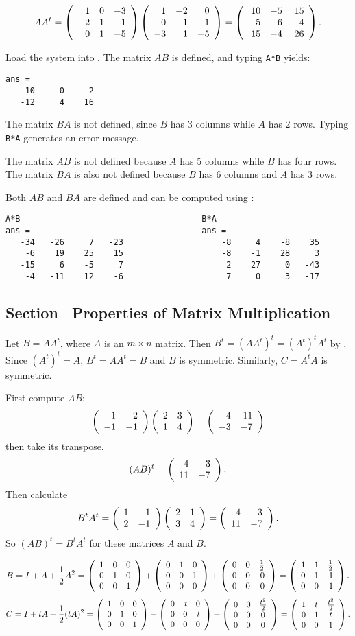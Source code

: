 \[ AA^t = \left(\begin{array}{rrr} 1 & 0 & -3 \\ -2 & 1 & 1 \\ 0 & 1 & -5\end{array}\right)
\left(\begin{array}{rrr} 1 & -2 & 0 \\ 0 & 1 & 1 \\ -3 & 1 & -5\end{array}\right) =
\left(\begin{array}{rrr} 10 & -5 & 15 \\ -5 & 6 & -4 \\ 15 & -4 & 26\end{array}\right). \]



Load the system into \Matlabp.  The matrix $AB$ is defined,
and typing {\tt A*B} yields:
\begin{verbatim}
ans =
    10     0    -2
   -12     4    16
\end{verbatim}
The matrix $BA$ is not defined, since $B$ has 3 columns while $A$
has 2 rows.  Typing {\tt B*A} generates an error message.

 The matrix $AB$ is not defined because $A$ has 5 columns
while $B$ has four rows.  The matrix $BA$ is also not defined
because $B$ has 6 columns and $A$ has 3 rows.

 Both $AB$ and $BA$ are defined and can be computed using
\Matlabp :
\begin{verbatim}
A*B                                     B*A
ans =                                   ans =   
   -34   -26     7   -23                    -8     4    -8    35
    -6    19    25    15                    -8    -1    28     3
   -15     6    -5     7                     2    27     0   -43
    -4   -11    12    -6                     7     0     3   -17
\end{verbatim}

\subsection*{Section~\protect{\ref{S:4.7}} Properties of Matrix Multiplication}

  Let $B = AA^t$, where $A$ is an $m \times n$ matrix.
Then $B^t = (AA^t)^t = (A^t)^tA^t$ by .  Since
$(A^t)^t=A$, $B^t=AA^t=B$ and $B$ is symmetric.  Similarly, $C = A^tA$
is symmetric.

 First compute $AB$:
\[ \left(\begin{array}{rr} 1 & 2\\ -1 &-1\end{array}\right)\left(\begin{array}{rr} 2 & 3\\ 1 &4\end{array}\right) =
\left(\begin{array}{rr} 4 & 11\\ -3 &-7\end{array}\right) \]
then take its transpose.
\[ (AB)^t = \left(\begin{array}{rr} 4 & -3\\ 11 &-7\end{array}\right). \]
Then calculate
\[ B^tA^t = \left(\begin{array}{rr} 1 & -1\\ 2 &-1\end{array}\right)\left(\begin{array}{rr} 2 & 1\\ 3 &4\end{array}\right) =
\left(\begin{array}{rr} 4 & -3\\ 11 &-7\end{array}\right). \]
So $(AB)^t = B^tA^t$ for these matrices $A$ and $B$.

\[ 
B = I + A + \frac{1}{2}A^2 =
 \left(\begin{array}{rrr} 1 & 0 & 0 \\ 0 & 1 & 0 \\ 0 & 0 & 1\end{array}\right) +
\left(\begin{array}{rrr} 0 & 1 & 0 \\ 0 & 0 & 1 \\ 0 & 0 & 0\end{array}\right) +
\left(\begin{array}{rrr} 0 & 0 & \frac{1}{2} \\ 0 & 0 & 0 \\ 0 & 0 & 0\end{array}\right)
= \left(\begin{array}{rrr} 1 & 1 & \frac{1}{2} \\ 0 & 1 & 1 \\ 0 & 0 & 1\end{array}\right). \]
\[ 
C = I + tA + \frac{1}{2}(tA)^2 
= \left(\begin{array}{rrr} 1 & 0 & 0 \\ 0 & 1 & 0 \\ 0 & 0 & 1\end{array}\right) +
\left(\begin{array}{rrr} 0 & t & 0 \\ 0 & 0 & t \\ 0 & 0 & 0\end{array}\right) +
\left(\begin{array}{ccc} 0 & 0 & \frac{t^2}{2} \\ 0 & 0 & 0 \\ 0 & 0 & 0\end{array}\right)
= \left(\begin{array}{ccc} 1 & t & \frac{t^2}{2} \\ 0 & 1 & t \\ 0 & 0 & 1\end{array}\right). \]


